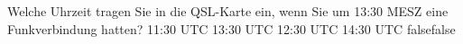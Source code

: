     {Welche Uhrzeit tragen Sie in die QSL-Karte ein, wenn Sie um 13:30 MESZ eine Funkverbindung hatten?}
    {11:30 UTC}
    {13:30 UTC}
    {12:30 UTC}
    {14:30 UTC}
    {false}{false}